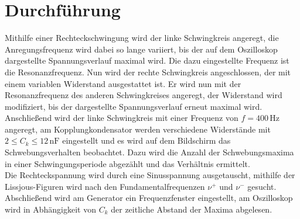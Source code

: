 \section{Durchführung}
\label{sec:Durchführung}
Mithilfe einer Rechteckschwingung wird der linke Schwingkreis angeregt, die Anregungsfrequenz wird dabei so lange variiert, bis der auf dem Oszilloskop dargestellte Spannungsverlauf maximal wird. Die dazu eingestellte
Frequenz ist die Resonanzfrequenz. Nun wird der rechte Schwingkreis angeschlossen, der mit einem variablen Widerstand ausgestattet ist. Er wird nun mit der Resonanzfrequenz des anderen Schwingkreises angeregt, der
Widerstand wird modifiziert, bis der dargestellte Spannungsverlauf erneut maximal wird. \\

Anschließend wird der linke Schwingkreis mit einer Frequenz von $f = 400 \, \unit{\hertz}$ angeregt, am Kopplungkondensator werden verschiedene Widerstände mit $2 \leq C_k \leq 12 \, \unit{\nano\farad}$ eingestellt und
es wird auf dem Bildschirm das Schwebungsverhalten beobachtet. Dazu wird die Anzahl der Schwebungsmaxima in einer Schwingungsperiode abgezählt und das Verhältnis ermittelt. \\

Die Rechteckspannung wird durch eine Sinusspannung ausgetauscht, mithilfe der Lissjous-Figuren wird nach den Fundamentalfrequenzen $ν^+$ und $ν^-$ gesucht. \\

Abschließend wird am Generator ein Frequenzfenster eingestellt, am Oszilloskop wird in Abhängigkeit von $C_k$ der zeitliche Abstand der Maxima abgelesen.